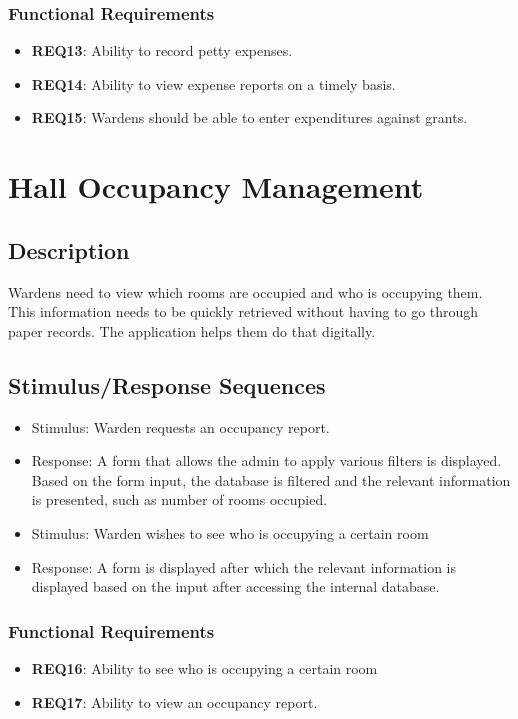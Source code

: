 \documentclass{scrreprt}
\begin{document}
\subsubsection{Functional Requirements}
\begin{itemize}
    \item \textbf{REQ13}: Ability to record petty expenses.
    \item \textbf{REQ14}: Ability to view expense reports on a timely basis.
    \item \textbf{REQ15}: Wardens should be able to enter expenditures against grants.
\end{itemize}

\section{Hall Occupancy Management}
\subsection{Description}
Wardens need to view which rooms are occupied and who is occupying them. This information needs to be quickly retrieved without having to go through paper records. The application helps them do that digitally.
\subsection{Stimulus/Response Sequences}
\begin{itemize}
    \item Stimulus: Warden requests an occupancy report.
    \item Response: A form that allows the admin to apply various filters is displayed. Based on the form input, the database is filtered and the relevant information is presented, such as number of rooms occupied.
\end{itemize}

\begin{itemize}
    \item Stimulus: Warden wishes to see who is occupying a certain room
    \item Response: A form is displayed after which the relevant information is displayed based on the input after accessing the internal database.
\end{itemize}
\subsubsection{Functional Requirements}
\begin{itemize}
    \item \textbf{REQ16}: Ability to see who is occupying a certain room
    \item \textbf{REQ17}: Ability to view an occupancy report.
\end{itemize}
\end{document}
